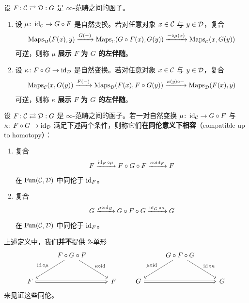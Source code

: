 \begin{definition}\label{L12-1.5}
设 $F\colon\mathcal{C}\rightleftarrows\mathcal{D}:G$ 是 $\infty$-范畴之间的函子。
\begin{enumerate}[label=(\arabic*),leftmargin=2.4em,itemsep=0.4em]
\item 设 $\mu\colon\operatorname{id}_{\mathcal{C}}\to G\circ F$ 是自然变换。若对任意对象 $x\in\mathcal{C}$ 与 $y\in\mathcal{D}$，复合
\begin{equation}\label{L12-eq1.1}
\operatorname{Maps}_{\mathcal{D}}(F(x),y)\xrightarrow{G(-)}\operatorname{Maps}_{\mathcal{C}}(G\circ F(x),G(y))\xrightarrow{-\circ\mu(x)}\operatorname{Maps}_{\mathcal{C}}(x,G(y))
\end{equation}
可逆，则称 $\mu$ \textbf{展示 $F$ 为 $G$ 的左伴随}。
\item 设 $\kappa\colon F\circ G\to\operatorname{id}_{\mathcal{D}}$ 是自然变换。若对任意对象 $x\in\mathcal{C}$ 与 $y\in\mathcal{D}$，复合
\begin{equation}\label{L12-eq1.2}
\operatorname{Maps}_{\mathcal{C}}(x,G(y))\xrightarrow{F(-)}\operatorname{Maps}_{\mathcal{D}}(F(x),F\circ G(y))\xrightarrow{\kappa(y)\circ-}\operatorname{Maps}_{\mathcal{D}}(F(x),y)
\end{equation}
可逆，则称 $\kappa$ \textbf{展示 $F$ 为 $G$ 的左伴随}。
\end{enumerate}
\end{definition}

\begin{definition}\label{L12-1.6}
设 $F\colon\mathcal{C}\rightleftarrows\mathcal{D}:G$ 是 $\infty$-范畴之间的函子。若一对自然变换 $\mu\colon\operatorname{id}_{\mathcal{C}}\to G\circ F$ 与 $\kappa\colon F\circ G\to\operatorname{id}_{\mathcal{D}}$ 满足下述两个条件，则称它们\textbf{在同伦意义下相容}（compatible up to homotopy）：
\begin{enumerate}[label=(\roman*),leftmargin=2.6em,itemsep=0.3em]
\item 复合
\[
F\xrightarrow{\operatorname{id}_F\circ\mu}F\circ G\circ F\xrightarrow{\kappa\circ\operatorname{id}_F}F
\]
在 $\operatorname{Fun}(\mathcal{C},\mathcal{D})$ 中同伦于 $\operatorname{id}_F$。
\item 复合
\[
G\xrightarrow{\mu\circ\operatorname{id}_G}G\circ F\circ G\xrightarrow{\operatorname{id}_G\circ\kappa}G
\]
在 $\operatorname{Fun}(\mathcal{C},\mathcal{D})$ 中同伦于 $\operatorname{id}_F$。
\end{enumerate}
\end{definition}


\begin{warning}\label{L12-1.7}
上述定义中，我们\textbf{并不}提供 2-单形
\[
\begin{tikzcd}[column sep=2.8em,row sep=2.4em]
& F\circ G\circ F \arrow[dl,"\id\circ\mu"'] \arrow[dr,"\kappa\circ\id"] & \\
F \arrow[rr, Rightarrow] & & F
\end{tikzcd}
\qquad
\begin{tikzcd}[column sep=2.8em,row sep=2.4em]
& G\circ F\circ G \arrow[dl,"\mu\circ\id"'] \arrow[dr,"\id\circ\kappa"] & \\
G \arrow[rr, Rightarrow] & & G
\end{tikzcd}
\]
来见证这些同伦。
\end{warning}

